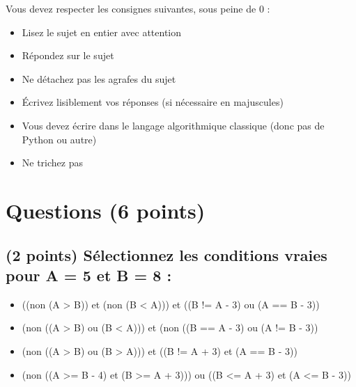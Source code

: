 \documentclass[11pt,a4paper]{article}
\begin{document}
\MakeExamTitle                   %


\bigskip
\bigskip

Vous devez respecter les consignes suivantes, sous peine de 0 :

\begin{itemize}
\item Lisez le sujet en entier avec attention
\item Répondez sur le sujet
\item Ne détachez pas les agrafes du sujet
\item \'Ecrivez lisiblement vos réponses (si nécessaire en majuscules)
\item Vous devez écrire dans le langage algorithmique classique (donc pas de Python ou autre)
\item Ne trichez pas
\end{itemize}

\bigskip


\section{Questions (6 points)}

\subsection{(2 points) Sélectionnez les conditions vraies pour A = 5 et B = 8 : }

\bigskip

\begin{itemize}
  \item[\CaseCoche] ((non (A > B)) et (non (B < A))) et ((B != A - 3) ou (A == B - 3)) \\ %
  \item[\CaseCoche] (non ((A > B) ou (B < A))) et (non ((B == A - 3) ou (A != B - 3)) \\ %
  \item[\CaseCoche] (non ((A > B) ou (B > A))) et ((B != A + 3) et (A == B - 3)) \\ %
  \item[\CaseCoche] (non ((A >= B - 4) et (B >= A + 3))) ou ((B <= A + 3) et (A <= B - 3)) \\ %
\end{itemize}
\end{document}
